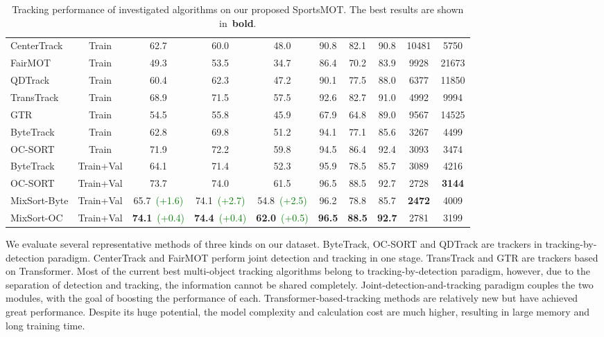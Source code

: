 \documentclass[10pt,twocolumn,letterpaper]{article}
\begin{document}
{\begin{table*}[!t]
\begin{center}
{{\begin{tabular}{l|c|cccccccc}
\midrule
CenterTrack~\cite{zhou2020tracking} & Train           & 62.7 & 60.0 & 48.0 & 90.8 & 82.1& 90.8 & 10481  & 5750 \\
FairMOT~\cite{zhang2021fairmot}       & Train           & 49.3 & 53.5 & 34.7 & 86.4  & 70.2& 83.9 & 9928  & 21673 \\
QDTrack~\cite{pang2021quasi}      & Train          & 60.4 & 62.3 & 47.2 & 90.1 & 77.5 & 88.0 & 6377  & 11850 \\
TransTrack~\cite{sun2020transtrack}    & Train         & 68.9 & 71.5 & 57.5 & 92.6  & 82.7 & 91.0 & 4992  & 9994 \\
GTR~\cite{zhou2022global}      & Train             & 54.5 & 55.8 & 45.9  & 67.9 & 64.8 & 89.0 & 9567  &  14525 \\ 
ByteTrack~\cite{zhang2022bytetrack}    & Train           & 62.8 & 69.8 & 51.2 & 94.1 & 77.1 & 85.6 & 3267 &  4499 \\
OC-SORT~\cite{cao2022observation}   & Train            & 71.9 & 72.2 & 59.8 & 94.5 & 86.4 & 92.4 & 3093 &  3474 \\
ByteTrack & Train+Val & 64.1 & 71.4& 52.3 & 95.9  & 78.5 & 85.7 &  3089 & 4216\\
OC-SORT & Train+Val & 73.7 & 74.0 & 61.5 & 96.5 & 88.5 & 92.7 & 2728 & \textbf{3144} \\
\midrule
MixSort-Byte  & Train+Val    & 65.7~\textcolor{green}{(+1.6)} & 74.1~\textcolor{green}{(+2.7)}& 54.8~\textcolor{green}{(+2.5)} & 96.2  & 78.8 & 85.7 & \textbf{2472} &  4009 \\
MixSort-OC    & Train+Val    & \textbf{74.1}~\textcolor{green}{(+0.4)} & \textbf{74.4}~\textcolor{green}{(+0.4)}  & \textbf{62.0}~\textcolor{green}{(+0.5)} & \textbf{96.5} & \textbf{88.5} & \textbf{92.7}& 2781  & 3199  \\
\bottomrule
\end{tabular}}}
\end{center}
\vspace{-6mm}
\caption{Tracking performance of investigated algorithms on our proposed SportsMOT. The best results are shown in~\textbf{bold}.}
\vspace{-4mm}
\label{table_mot}
\end{table*}

We evaluate several representative methods of three kinds on our dataset. ByteTrack\cite{zhang2022bytetrack}, OC-SORT\cite{cao2022observation} and QDTrack\cite{pang2021quasi} are trackers in tracking-by-detection paradigm. CenterTrack\cite{zhou2020tracking} and FairMOT\cite{zhang2021fairmot} perform joint detection and tracking in one stage. TransTrack\cite{sun2020transtrack} and GTR\cite{zhou2022global} are trackers based on Transformer. Most of the current best multi-object tracking algorithms belong to tracking-by-detection paradigm, however, due to the separation of detection and tracking, the information cannot be shared completely. Joint-detection-and-tracking paradigm couples the two modules, with the goal of boosting the performance of each. Transformer-based-tracking methods are relatively new but have achieved great performance. Despite its huge potential, the model complexity and calculation cost are much higher, resulting in large memory and long training time.

}
\end{document}
